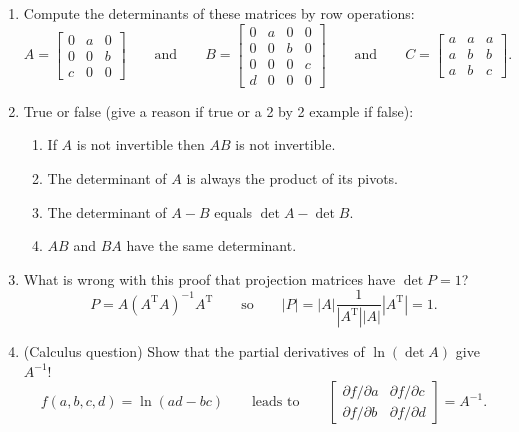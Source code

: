 \documentclass[14pt, a4paper]{article}
\begin{document}
\begin{enumerate}[resume]
    \item Compute the determinants of these matrices by row operations:
          \[
              A = \begin{bmatrix} 0 & a & 0 \\ 0 & 0 & b \\ c & 0 & 0 \end{bmatrix} \qquad \text{and} \qquad
              B = \begin{bmatrix} 0 & a & 0 & 0 \\ 0 & 0 & b & 0 \\ 0 & 0 & 0 & c \\ d & 0 & 0 & 0 \end{bmatrix} \qquad \text{and} \qquad
              C = \begin{bmatrix} a & a & a \\ a & b & b \\ a & b & c \end{bmatrix}.
          \]

    \item True or false (give a reason if true or a 2 by 2 example if false):
          \begin{enumerate}
              \item If $A$ is not invertible then $AB$ is not invertible.
              \item The determinant of $A$ is always the product of its pivots.
              \item The determinant of $A - B$ equals $\det A - \det B$.
              \item $AB$ and $BA$ have the same determinant.
          \end{enumerate}

    \item What is wrong with this proof that projection matrices have $\det P = 1$?
          \[
              P = A(A^{\mathrm{T}}A)^{-1}A^{\mathrm{T}} \qquad \text{so} \qquad |P| = |A| \frac{1}{|A^{\mathrm{T}}||A|} |A^{\mathrm{T}}| = 1.
          \]

    \item (Calculus question) Show that the partial derivatives of $\ln(\det A)$ give $A^{-1}$!
          \[
              f(a, b, c, d) = \ln(ad - bc) \qquad \text{leads to} \qquad \begin{bmatrix} \partial f/\partial a & \partial f/\partial c \\ \partial f/\partial b & \partial f/\partial d \end{bmatrix} = A^{-1}.
          \]


\end{enumerate}
\end{document}
